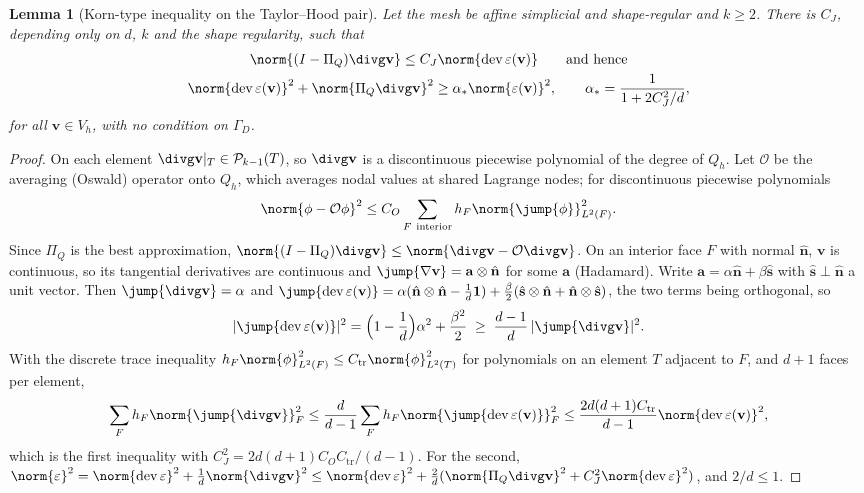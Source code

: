 \documentclass[11pt]{article}
\numberwithin{equation}{section}
\newtheorem{lemma}[proposition]{Lemma}
\theoremstyle{remark}
\newcommand{\eps}{\varepsilon}
\newcommand{\dev}{\operatorname{dev}}
\newcommand{\vv}{\mathbf{v}}
\newcommand{\vn}{\hat{\mathbf{n}}}
\newcommand{\one}{\mathbf{1}}
\newcommand{\Vh}{V_h}
\newcommand{\Qh}{Q_h}
\newcommand{\Pq}{\Pi_{Q}}
\begin{document}
\begin{lemma}[Korn-type inequality on the Taylor--Hood pair]
\label{lem:korn}
Let the mesh be affine simplicial and shape-regular and $k\ge2$. There is
$C_J$, depending only on $d$, $k$ and the shape regularity, such that
\begin{equation}
\begin{gathered}
  \norm{(I - \Pq)\divg\vv}\le C_J\norm{\dev\eps(\vv)}
  \qquad\text{and hence}\\
  \norm{\dev\eps(\vv)}^2 + \norm{\Pq\divg\vv}^2\ge\alpha_*\norm{\eps(\vv)}^2,
  \qquad \alpha_* = \frac{1}{1 + 2C_J^2/d},
\end{gathered}
  \label{eq:korn}
\end{equation}
for all $\vv\in\Vh$, with no condition on $\Gamma_D$.
\end{lemma}
\begin{proof}
On each element $\divg\vv|_T\in\mathcal P_{k-1}(T)$, so $\divg\vv$ is a
discontinuous piecewise polynomial of the degree of $\Qh$. Let $\mathcal
O$ be the averaging (Oswald) operator onto $\Qh$, which averages nodal
values at shared Lagrange nodes; for discontinuous piecewise polynomials
\cite[Thm.~2.2]{KarakashianPascal2003}
\[
  \norm{\phi - \mathcal O\phi}^2\le C_O\sum_{F\ \text{interior}}
  h_F\norm{\jump{\phi}}_{L^2(F)}^2 .
\]
Since $\Pq$ is the best approximation, $\norm{(I-\Pq)\divg\vv}\le
\norm{\divg\vv - \mathcal O\divg\vv}$. On an interior face $F$ with normal
$\vn$, $\vv$ is continuous, so its tangential derivatives are continuous
and $\jump{\nabla\vv} = \mathbf a\otimes\vn$ for some $\mathbf a$
(Hadamard). Write $\mathbf a = \alpha\vn + \beta\hat{\mathbf s}$ with
$\hat{\mathbf s}\perp\vn$ a unit vector. Then $\jump{\divg\vv} = \alpha$ and
$\jump{\dev\eps(\vv)} = \alpha(\vn\otimes\vn - \frac1d\one) +
\frac\beta2(\hat{\mathbf s}\otimes\vn + \vn\otimes\hat{\mathbf s})$, the two
terms being orthogonal, so
\[
  |\jump{\dev\eps(\vv)}|^2 = \Bigl(1 - \frac1d\Bigr)\alpha^2 +
  \frac{\beta^2}{2}\;\ge\;\frac{d-1}{d}\,|\jump{\divg\vv}|^2 .
\]
With the discrete trace inequality $h_F\norm{\phi}^2_{L^2(F)}\le
C_{\mathrm{tr}}\norm{\phi}^2_{L^2(T)}$ for polynomials on an element $T$
adjacent to $F$, and $d+1$ faces per element,
\[
  \sum_F h_F\norm{\jump{\divg\vv}}_F^2
  \le\frac{d}{d-1}\sum_F h_F\norm{\jump{\dev\eps(\vv)}}_F^2
  \le\frac{2d(d+1)C_{\mathrm{tr}}}{d-1}\norm{\dev\eps(\vv)}^2 ,
\]
which is the first inequality with $C_J^2 = 2d(d+1)C_OC_{\mathrm{tr}}/(d-1)$.
For the second, $\norm{\eps}^2 = \norm{\dev\eps}^2 + \frac1d\norm{\divg\vv}^2
\le\norm{\dev\eps}^2 + \frac2d(\norm{\Pq\divg\vv}^2 + C_J^2\norm{\dev\eps}^2)$,
and $2/d\le1$.
\end{proof}
\end{document}

